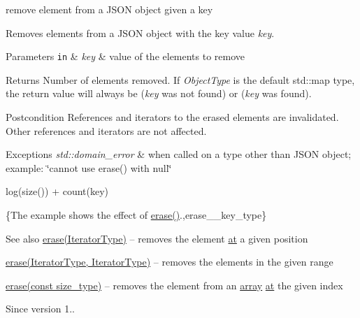 remove element from a J\+S\+ON object given a key 

Removes elements from a J\+S\+ON object with the key value {\itshape key}.


\begin{DoxyParams}[1]{Parameters}
\mbox{\tt in}  & {\em key} & value of the elements to remove\\
\hline
\end{DoxyParams}
\begin{DoxyReturn}{Returns}
Number of elements removed. If {\itshape Object\+Type} is the default {\ttfamily std\+::map} type, the return value will always be {} ({\itshape key} was not found) or {} ({\itshape key} was found).
\end{DoxyReturn}
\begin{DoxyPostcond}{Postcondition}
References and iterators to the erased elements are invalidated. Other references and iterators are not affected.
\end{DoxyPostcond}

\begin{DoxyExceptions}{Exceptions}
{\em std\+::domain\+\_\+error} & when called on a type other than J\+S\+ON object; example\+: {\ttfamily \char`\"{}cannot use erase() with null\char`\"{}}\\
\hline
\end{DoxyExceptions}
{\ttfamily log(size()) + count(key)}

\{The example shows the effect of {\ttfamily \hyperlink{classnlohmann_1_1basic__json_ab9f8c9a02d6bb794ee26801a232ca4f4}{erase()}}.,erase\+\_\+\+\_\+key\+\_\+type\}

\begin{DoxySeeAlso}{See also}
\hyperlink{classnlohmann_1_1basic__json_ab9f8c9a02d6bb794ee26801a232ca4f4}{erase(\+Iterator\+Type)} -- removes the element \hyperlink{classnlohmann_1_1basic__json_a214a8c22d616fd3567b88932c07436c9}{at} a given position 

\hyperlink{classnlohmann_1_1basic__json_aa8996e3f8cd3e5113dcc3cb34bef7c0a}{erase(\+Iterator\+Type, Iterator\+Type)} -- removes the elements in the given range 

\hyperlink{classnlohmann_1_1basic__json_a3da254c422ede5495f2815c5e48c00c5}{erase(const size\+\_\+type)} -- removes the element from an \hyperlink{classnlohmann_1_1basic__json_a5685815624b086caa532f41e853d4b0f}{array} \hyperlink{classnlohmann_1_1basic__json_a214a8c22d616fd3567b88932c07436c9}{at} the given index
\end{DoxySeeAlso}
\begin{DoxySince}{Since}
version 1.. 
\end{DoxySince}
\hypertarget{classnlohmann_1_1basic__json_a3da254c422ede5495f2815c5e48c00c5}{}\label{classnlohmann_1_1basic__json_a3da254c422ede5495f2815c5e48c00c5} 
